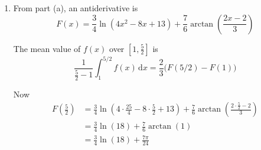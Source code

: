 \documentclass[leqno]{article}
\begin{document}
\begin{enumerate}[
  label=\textbf{\arabic*.},
  leftmargin=*,
  topsep=0pt,
  partopsep=0pt,
  parsep=0pt
]
\begin{tcolorbox}[colback=white, colframe=scarlet, title={\textbf{Solution}}, breakable, grow to left by=6mm, grow to right by=10mm]
\begin{enumerate}[label=\textbf{(\alph*)}]
Write the numerator in terms of the derivative of the denominator:
\[
6x+1=\frac34(8x-8)+7
\]

So
\begin{align*}
I
&=\frac34\int \frac{8x-8}{4x^2-8x+13}\,\mathrm{d}x
+7\int \frac{1}{4x^2-8x+13}\,\mathrm{d}x
\end{align*}

For the first integral,
\[
\int \frac{g'(x)}{g(x)}\,\mathrm{d}x=\ln|g(x)|+c
\]
and here
\[
4x^2-8x+13=(2x-2)^2+9>0
\]
so no modulus is needed. Hence
\[
\frac34\int \frac{8x-8}{4x^2-8x+13}\,\mathrm{d}x
=\frac34\ln(4x^2-8x+13)
\]

For the second integral, complete the square:
\[
4x^2-8x+13=(2x-2)^2+9
\]

Let \(u=2x-2\), so \(\mathrm{d}u=2\,\mathrm{d}x\) and \(\mathrm{d}x=\frac12\,\mathrm{d}u\). Then
\begin{align*}
7\int \frac{1}{(2x-2)^2+9}\,\mathrm{d}x
&=7\int \frac{1}{u^2+9}\cdot \frac12\,\mathrm{d}u \\
&=\frac72 \int \frac{1}{u^2+9}\,\mathrm{d}u
\end{align*}

Using the standard result
\[
\int \frac{1}{a^2+u^2}\,\mathrm{d}u=\frac1a\arctan\left(\frac{u}{a}\right)+c
\]
with \(a=3\),
\begin{align*}
\frac72 \int \frac{1}{u^2+9}\,\mathrm{d}u
&=\frac72 \cdot \frac13 \arctan\left(\frac{u}{3}\right) \\
&=\frac76 \arctan\left(\frac{u}{3}\right)
\end{align*}

Substituting back \(u=2x-2\),
\[
\int f(x)\,\mathrm{d}x
=\frac34\ln(4x^2-8x+13)+\frac76\arctan\left(\frac{2x-2}{3}\right)+c
\]

Therefore
\[
A=\frac34,\qquad B=\frac76
\]

  \item From part (a), an antiderivative is
\[
F(x)=\frac34\ln(4x^2-8x+13)+\frac76\arctan\left(\frac{2x-2}{3}\right)
\]

The mean value of \(f(x)\) over \(\left[1,\frac52\right]\) is
\[
\frac{1}{\frac52-1}\int_1^{5/2} f(x)\,\mathrm{d}x
=\frac23\bigl(F(5/2)-F(1)\bigr)
\]

Now
\begin{align*}
F\left(\frac52\right)
&=\frac34\ln\left(4\cdot\frac{25}{4}-8\cdot\frac52+13\right)
+\frac76\arctan\left(\frac{2\cdot\frac52-2}{3}\right) \\
&=\frac34\ln(18)+\frac76\arctan(1) \\
&=\frac34\ln(18)+\frac{7\pi}{24}
\end{align*}


\end{enumerate}
\end{tcolorbox}
\end{enumerate}
\end{document}

